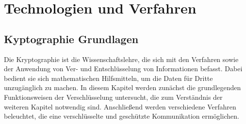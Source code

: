 \documentclass  [paper=a4,
				fontsize=12pt,
				listof=totoc,
				bibliography=totoc
				]{scrreprt}
\begin{document}
	
	\chapter{Technologien und Verfahren}\label{chap:technologien-und-verfahren}
		\section{Kyptographie Grundlagen}
				Die Kryptographie ist die Wissenschaftslehre, die sich mit den Verfahren sowie der Anwendung von Ver- und Entschlüsselung von Informationen befasst. Dabei bedient sie sich mathematischen Hilfsmitteln, um die Daten für Dritte unzugänglich zu machen. In diesem Kapitel werden zunächst die grundlegenden Funktionsweisen der Verschlüsselung untersucht, die zum Verständnis der weiteren Kapitel notwendig sind. Anschließend werden verschiedene Verfahren beleuchtet, die eine verschlüsselte und geschützte Kommunikation ermöglichen.
\end{document}
